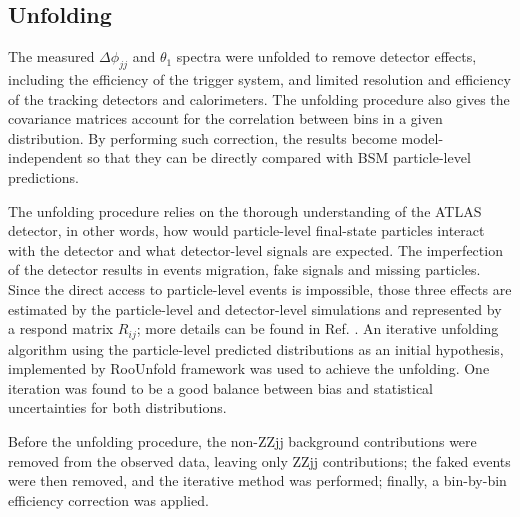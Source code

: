 \documentclass[a4paper,12pt]{article}
\begin{document}
		\subsection{Unfolding}
			\par The measured $\Delta\phi_{jj}$ and $\theta_1$ spectra were unfolded to remove detector effects, including
			the efficiency of the trigger system, and limited resolution and efficiency of the tracking detectors and calorimeters\cite{Schmitt_2017}.
			The unfolding procedure also gives the covariance matrices account for the correlation between bins in a given distribution.
			By performing such correction, the results become model-independent so that they can be directly compared with 
			BSM particle-level predictions. 
			\par The unfolding procedure relies on the thorough understanding of the ATLAS detector, in other words, how would
			particle-level final-state particles interact with the detector and what detector-level signals are expected.
			The imperfection of the detector results in events migration, fake signals and missing particles. Since the direct access to particle-level 
			events is impossible, those three effects are estimated by the particle-level and detector-level simulations and represented by 
			a respond matrix $R_{ij}$; more details can be found in Ref. \cite{last:2020}. An iterative unfolding algorithm\cite{DAgostini:1994fjx} 
			using the particle-level predicted distributions as an initial hypothesis, implemented by RooUnfold framework\cite{adye2011unfolding} was used 
			to achieve the unfolding. One iteration was found to be a good balance between bias and statistical uncertainties for both distributions.
			\par Before the unfolding procedure, the non-ZZjj background contributions were removed from the observed data, leaving only ZZjj 
			contributions; the faked events were then removed, and the iterative method was performed; finally, a bin-by-bin efficiency correction 
			was applied. 
\end{document}
